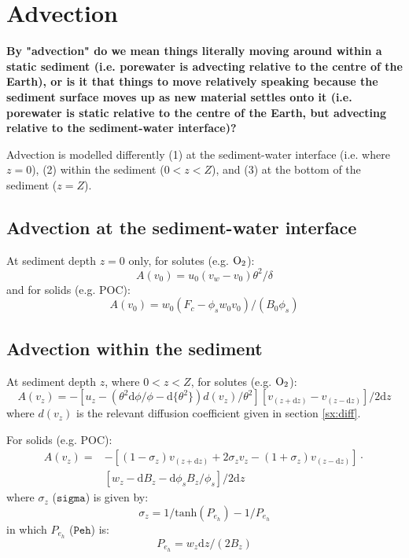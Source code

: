 \documentclass[a4paper]{article}
\newcommand{\D}[1]{\mathrm{d}#1}
\newcommand{\code}[1]{\texttt{#1}}
\newcommand{\wtf}[1]{\textcolor{Cerulean}{\textbf{#1}}}
\begin{document}
\section{Advection}

\wtf{By "advection" do we mean things literally moving around within a static sediment (i.e. porewater is advecting relative to the centre of the Earth), or is it that things to move relatively speaking because the sediment surface moves up as new material settles onto it (i.e. porewater is static relative to the centre of the Earth, but advecting relative to the sediment-water interface)?}

Advection is modelled differently (1) at the sediment-water interface (i.e. where $z = 0$), (2) within the sediment ($0 < z < Z$), and (3) at the bottom of the sediment ($z = Z$).

\subsection{Advection at the sediment-water interface}\label{sx:adv_swi}

At sediment depth $z = 0$ only, for solutes (e.g. $\ce{O2}$):
\begin{equation}
A(v_0) = u_0 (v_w - v_0) \theta^2 / \delta
\end{equation}
and for solids (e.g. POC):
\begin{equation}
A(v_0) = w_0 (F_c - \phi_s w_0 v_0) / (B_0 \phi_s)
\end{equation}

\subsection{Advection within the sediment}

At sediment depth $z$, where $0 < z < Z$, for solutes (e.g. $\ce{O2}$):
\begin{equation}
A(v_z) = -[u_z - (\theta^2 \D{\phi} / \phi - \D{\{\theta^2\}}) d(v_z) / \theta^2] [v_{(z+\D{z})} - v_{(z-\D{z})}] / 2 \D{z}
\end{equation}
where $d(v_z)$ is the relevant diffusion coefficient given in section \ref{sx:diff}.

For solids (e.g. POC):
\begin{equation}
\begin{split}
A(v_z) = & -[(1 - \sigma_z) v_{(z+\D{z})} + 2 \sigma_z v_z - (1 + \sigma_z) v_{(z-\D{z})}] \cdot \\
& [w_z - \D{B_z} - \D{\phi_s} B_z / \phi_s] / 2 \D{z}
\end{split}
\end{equation}
where $\sigma_z$ ($\code{sigma}$) is given by:
\begin{equation}
\sigma_z = 1 / \mathrm{tanh}(P_{e_h}) - 1 / P_{e_h}
\end{equation}
in which $P_{e_h}$ ($\code{Peh}$) is:
\begin{equation}
P_{e_h} = w_z \D{z} / (2 B_z)
\end{equation}
\end{document}
